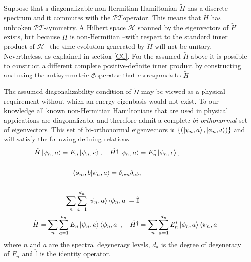 \documentclass[12pt, a4paper]{report}
\newcommand\PT{\(\mathcal{PT}\)}
\newcommand\CC{\(\mathcal{C}\)}
\begin{document}
Suppose that a diagonalizable non-Hermitian Hamiltonian $\tilde{H}$ has a discrete spectrum and it commutes with the \PT\:operator.  This means that  $\tilde{H}$ has unbroken \PT-symmetry. A Hilbert space $\mathcal{H}$ spanned by the eigenvectors of $\tilde{H}$ exists, but because $\tilde{H}$ is non-Hermitian --with respect to the standard inner product of $\mathcal{H}$-- the time evolution generated by $\tilde{H}$ will not be unitary\cite{Mostafazadeh}. Nevertheless, as explained in section \ref{CC}. For the assumed $\tilde{H}$ above it is possible to construct a different complete positive-definite inner product by constructing and using the antisymmetric \CC\:operator that corresponds to $\tilde{H}$.

The assumed diagonalizability condition of $\tilde{H}$ may be viewed as a physical requirement without which an energy eigenbasis would not exist. To our knowledge all known non-Hermitian Hamiltonians that are used in physical applications are diagonalizable and therefore admit a complete \emph{bi-orthonormal} set of eigenvectors. This set of bi-orthonormal eigenvectors is $\{(\ket{\psi_{n}, a}, \ket{\phi_{n}, a})\}$ and will satisfy the following defining relations\cite{Pseudo-HermiticityIII}
\begin{align}
\tilde{H}\ket{\psi_{n}, a} = E_{n}\ket{\psi_{n}, a},\quad\tilde{H^{\dagger}}\ket{\phi_{n}, a} &= E^{*}_{n}\ket{\phi_{n}, a},\\
\nonumber\\
\braket{\phi_{m}, b|\psi_{n}, a} = \delta_{mn}\delta_{ab}&,\\
\nonumber\\
\sum^{}_{n}\sum_{a=1}^{d_n}\ket{\psi_{n}, a}\bra{\phi_{n}, a} = \hat{\mathbb{I}}&\\
\tilde{H} = \sum^{}_{n}\sum_{a=1}^{d_n}E_{n}\ket{\psi_{n}, a}\bra{\phi_{n}, a},\quad\tilde{H^{\dagger}} &= \sum^{}_{n}\sum_{a=1}^{d_n}E_{n}^{*}\ket{\phi_{n}, a}\bra{\psi_{n}, a}
\end{align}
where $n$ and $a$ are the spectral degeneracy levels, $d_n$ is the degree of degeneracy of $E_n$ and $\hat{\mathbb{I}}$ is the identity operator\cite{Pseudo-HermiticityIII}.

\end{document}
